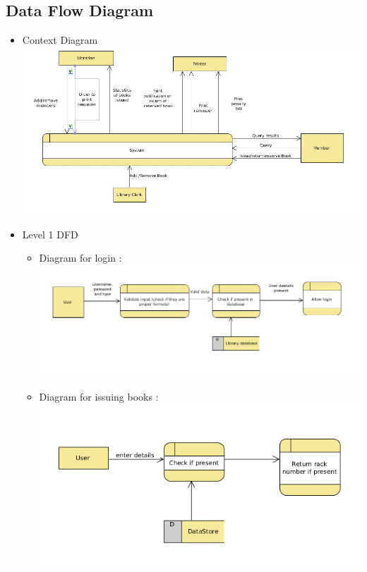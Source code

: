\documentclass[a4paper]{article}
\begin{document}
\subsection{Data Flow Diagram}

\begin{itemize}
\item Context Diagram\\
\includegraphics[scale=0.5]{images/contextDiag.jpg}
\item Level 1 DFD\\
\begin{itemize}
\item Diagram for login : \\
\includegraphics[scale=0.5]{images/dfdDiagLogin.png}\\
\item Diagram for issuing books : \\ \includegraphics[scale=0.5]{images/DFDDiagIssue.png}\\

\end{itemize}
\end{itemize}
\end{document}

